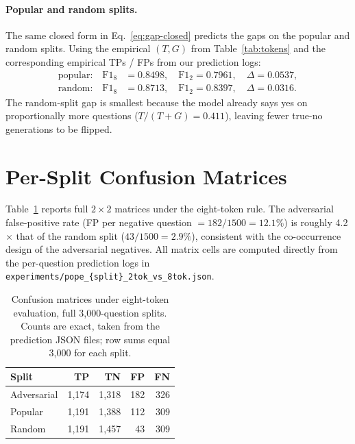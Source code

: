 \documentclass{article}
\begin{document}
\paragraph{Popular and random splits.} The same closed form in
Eq.~\ref{eq:gap-closed} predicts the gaps on the popular and random
splits. Using the empirical $(T, G)$ from Table~\ref{tab:tokens} and
the corresponding empirical TPs / FPs from our prediction logs:
\begin{align*}
\text{popular:}\quad \mathrm{F1}_8 &= 0.8498, \quad
                    \mathrm{F1}_2  = 0.7961, \quad \Delta = 0.0537, \\
\text{random:}\quad  \mathrm{F1}_8 &= 0.8713, \quad
                    \mathrm{F1}_2  = 0.8397, \quad \Delta = 0.0316.
\end{align*}
The random-split gap is smallest because the model already says yes on
proportionally more questions ($T/(T{+}G) = 0.411$), leaving fewer
true-no generations to be flipped.

\section{Per-Split Confusion Matrices}
\label{app:confusion}

Table~\ref{tab:confusion} reports full $2 \times 2$ matrices under the
eight-token rule. The adversarial false-positive rate (FP per negative
question $= 182/1500 = 12.1\%$) is roughly 4.2$\times$ that of the
random split ($43/1500 = 2.9\%$), consistent with the co-occurrence
design of the adversarial negatives. All matrix cells are computed
directly from the per-question prediction logs in
\texttt{experiments/pope\_\{split\}\_2tok\_vs\_8tok.json}.

\begin{table}[h]
\caption{Confusion matrices under eight-token evaluation, full
3{,}000-question splits. Counts are exact, taken from the prediction
JSON files; row sums equal 3{,}000 for each split.}
\label{tab:confusion}
\centering
\begin{tabular}{lrrrr}
\toprule
Split & TP & TN & FP & FN \\
\midrule
Adversarial & 1{,}174 & 1{,}318 & 182 & 326 \\
Popular     & 1{,}191 & 1{,}388 & 112 & 309 \\
Random      & 1{,}191 & 1{,}457 &  43 & 309 \\
\bottomrule
\end{tabular}
\end{table}
\end{document}
